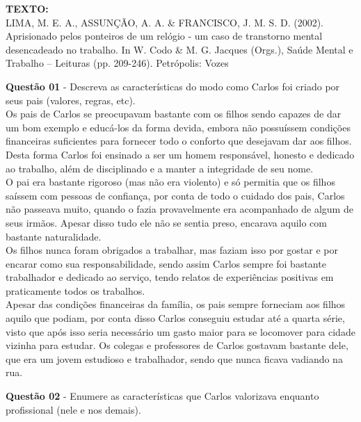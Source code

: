     \noindent\textbf{TEXTO:}\\
    
    \noindent LIMA, M. E. A., ASSUNÇÃO, A. A. \& FRANCISCO, J. M. S. D. (2002). Aprisionado pelos ponteiros de um relógio - um caso de transtorno mental desencadeado no trabalho. In W. Codo \& M. G. Jacques (Orgs.), Saúde Mental e Trabalho – Leituras (pp. 209-246). Petrópolis: Vozes 

    \begin{description}
    
        \item \textbf{Questão 01} -  Descreva as características do modo como Carlos foi criado por seus pais (valores, regras, etc). \\
        
        Os pais de Carlos se preocupavam bastante com os filhos sendo capazes de dar um bom exemplo e educá-los da forma devida, embora não possuíssem condições financeiras suficientes para fornecer todo o conforto que desejavam dar aos filhos. Desta forma Carlos foi ensinado a ser um homem responsável, honesto e dedicado ao trabalho, além de disciplinado e a manter a integridade de seu nome. \\
        
        O pai era bastante rigoroso (mas não era violento) e só permitia que os filhos saíssem com pessoas de confiança, por conta de todo o cuidado dos pais, Carlos não passeava muito, quando o fazia provavelmente era acompanhado de algum de seus irmãos. Apesar disso tudo ele não se sentia preso, encarava aquilo com bastante naturalidade. \\
        
        Os filhos nunca foram obrigados a trabalhar, mas faziam isso por gostar e por encarar como sua responsabilidade, sendo assim Carlos sempre foi bastante trabalhador e dedicado ao serviço, tendo relatos de experiências positivas em praticamente todos os trabalhos. \\
        
        Apesar das condições financeiras da família, os pais sempre forneciam aos filhos aquilo que podiam, por conta disso Carlos conseguiu estudar até a quarta série, visto que após isso seria necessário um gasto maior para se locomover para cidade vizinha para estudar. Os colegas e professores de Carlos gostavam bastante dele, que era um jovem estudioso e trabalhador, sendo que nunca ficava vadiando na rua.
                
        \item \textbf{Questão 02} - Enumere as características que Carlos valorizava enquanto profissional (nele e nos demais). 
        

\end{description}
